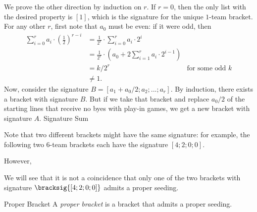 {{        We prove the other direction by induction on $r$. If $r = 0$, then the only list with the desired property is $[1]$, which is the signature for the unique $1$-team bracket. For any other $r$, first note that $a_0$ must be even: if it were odd, then \begin{align*}
            \sum_{i=0}^r a_i \cdot \left(\frac{1}{2}\right)^{r - i}
            &= \frac{1}{2^r} \cdot \sum_{i=0}^r a_i \cdot 2^i\\
            &= \frac{1}{2^r} \cdot \left(a_0 + 2 \sum_{i=1}^r a_i \cdot 2^{i-1}\right)\\
            &= k/2^r &\textrm{for some odd $k$}\\
            &\neq 1.
        \end{align*}
        Now, consider the signature $B = [a_1 + a_0/2; a_2; ...; a_r].$ By induction, there exists a bracket with signature $B$. But if we take that bracket and replace $a_0/2$ of the starting lines that receive no byes with play-in games, we get a new bracket with signature $A.$
}{Signature Sum}

Note that two different brackets might have the same signature: for example, the following two $6$-team brackets each have the signature $[4;2;0;0].$


However,


We will see that it is not a coincidence that only one of the two brackets with signature $\bracksig{[4;2;0;0]}$ admits a proper seeding.

\begin{definition}{Proper Bracket}{}
    A \textit{proper bracket} is a bracket that admits a proper seeding.
\end{definition}

}
